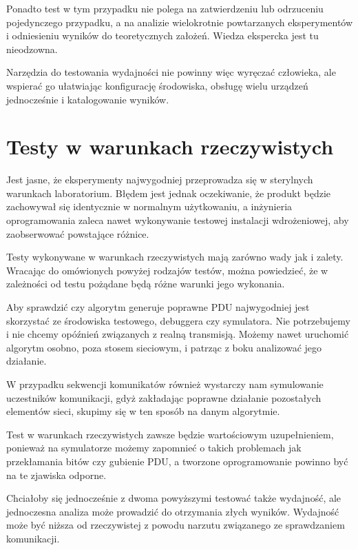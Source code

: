 \documentclass[00-praca-magisterska.tex]{subfiles}
\begin{document}
Ponadto test w tym przypadku nie polega na zatwierdzeniu lub odrzuceniu
pojedynczego przypadku, a na analizie wielokrotnie powtarzanych eksperymentów i
odniesieniu wyników do teoretycznych założeń. Wiedza ekspercka jest tu
nieodzowna.

Narzędzia do testowania wydajności nie powinny więc wyręczać człowieka, ale
wspierać go ułatwiając konfigurację środowiska, obsługę wielu urządzeń
jednocześnie i katalogowanie wyników.

\section{Testy w warunkach rzeczywistych}


Jest jasne, że eksperymenty najwygodniej przeprowadza się w sterylnych
warunkach laboratorium. Błędem jest jednak oczekiwanie, że produkt będzie
zachowywał się identycznie w normalnym użytkowaniu, a inżynieria oprogramowania
zaleca nawet wykonywanie testowej instalacji wdrożeniowej, aby zaobserwować
powstające różnice.

Testy wykonywane w warunkach rzeczywistych mają zarówno wady jak i zalety.
Wracając do omówionych powyżej rodzajów testów, można powiedzieć, że w
zależności od testu pożądane będą różne warunki jego wykonania.

Aby sprawdzić czy algorytm generuje poprawne PDU najwygodniej jest skorzystać
ze środowiska testowego, debuggera czy symulatora. Nie potrzebujemy i nie
chcemy opóźnień związanych z realną transmisją. Możemy nawet uruchomić algorytm
osobno, poza stosem sieciowym, i patrząc z boku analizować jego działanie.

W przypadku sekwencji komunikatów również wystarczy nam symulowanie
uczestników komunikacji, gdyż zakładając poprawne działanie pozostałych
elementów sieci, skupimy się w ten sposób na danym algorytmie.

Test w warunkach rzeczywistych zawsze będzie wartościowym uzupełnieniem,
ponieważ na symulatorze możemy zapomnieć o takich problemach jak przekłamania
bitów czy gubienie PDU, a tworzone oprogramowanie powinno być na te zjawiska odporne.

Chciałoby się jednocześnie z dwoma powyższymi testować także wydajność, ale
jednoczesna analiza może prowadzić do otrzymania złych wyników. Wydajność może
być niższa od rzeczywistej z powodu narzutu związanego ze sprawdzaniem
komunikacji.
\end{document}
